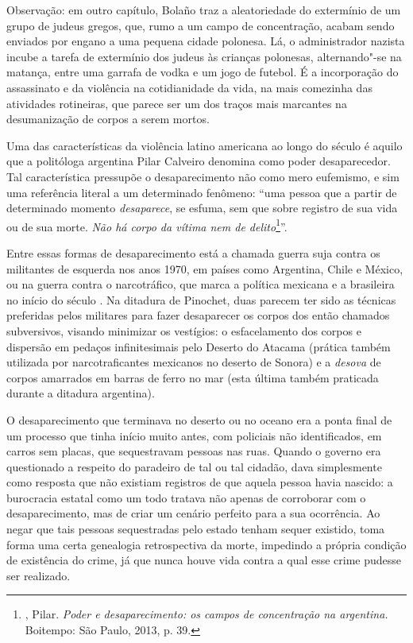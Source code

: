 Observação: em outro capítulo, Bolaño traz a aleatoriedade do extermínio
de um grupo de judeus gregos, que, rumo a um campo de concentração,
acabam sendo enviados por engano a uma pequena cidade polonesa. Lá, o
administrador nazista incube a tarefa de extermínio dos judeus às
crianças polonesas, alternando"-se na matança, entre uma garrafa de vodka
e um jogo de futebol. É a incorporação do assassinato e da violência na
cotidianidade da vida, na mais comezinha das atividades rotineiras, que
parece ser um dos traços mais marcantes na desumanização de corpos a
serem mortos.

\asterisc

Uma das características da violência latino americana ao longo do século
 é aquilo que a politóloga argentina Pilar Calveiro denomina como
poder desaparecedor. Tal característica pressupõe o desaparecimento não
como mero eufemismo, e sim uma referência literal a um determinado
fenômeno: ``uma pessoa que a partir de determinado momento
\emph{desaparece}, se esfuma, sem que sobre registro de sua vida ou de
sua morte. \emph{Não há corpo da vítima nem de delito}\footnote{,
  Pilar. \emph{Poder e desaparecimento: os campos de concentração na
  argentina.} Boitempo: São Paulo, 2013, p. 39.}''.

Entre essas formas de desaparecimento está a chamada guerra suja contra
os militantes de esquerda nos anos 1970, em países como Argentina, Chile
e México, ou na guerra contra o narcotráfico, que marca a política
mexicana e a brasileira no início do século . Na ditadura de
Pinochet, duas parecem ter sido as técnicas preferidas pelos militares
para fazer desaparecer os corpos dos então chamados subversivos, visando
minimizar os vestígios: o esfacelamento dos corpos e dispersão em
pedaços infinitesimais pelo Deserto do Atacama (prática também utilizada
por narcotraficantes mexicanos no deserto de Sonora) e a \emph{desova}
de corpos amarrados em barras de ferro no mar (esta última também
praticada durante a ditadura argentina).

O desaparecimento que terminava no deserto ou no oceano era a ponta
final de um processo que tinha início muito antes, com policiais não
identificados, em carros sem placas, que sequestravam pessoas nas ruas.
Quando o governo era questionado a respeito do paradeiro de tal ou tal
cidadão, dava simplesmente como resposta que não existiam registros de
que aquela pessoa havia nascido: a burocracia estatal como um todo
tratava não apenas de corroborar com o desaparecimento, mas de criar um
cenário perfeito para a sua ocorrência. Ao negar que tais pessoas
sequestradas pelo estado tenham sequer existido, toma forma uma certa
genealogia retrospectiva da morte, impedindo a própria condição de
existência do crime, já que nunca houve vida contra a qual esse crime
pudesse ser realizado.

